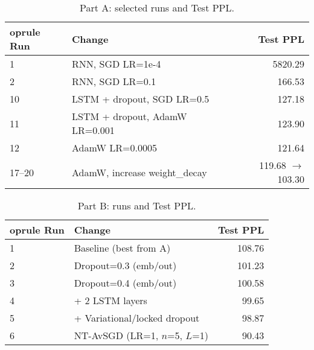 \documentclass[a4paper]{article}
\begin{document}
\begin{table}[h]
\centering
\caption{Part A: selected runs and Test PPL.}
\begin{tabular}{l l r}
	oprule
Run & Change & Test PPL \\
\midrule
1 & RNN, SGD LR=1e-4 & 5820.29 \\
2 & RNN, SGD LR=0.1 & 166.53 \\
10 & LSTM + dropout, SGD LR=0.5 & 127.18 \\
11 & LSTM + dropout, AdamW LR=0.001 & 123.90 \\
12 & AdamW LR=0.0005 & 121.64 \\
17--20 & AdamW, increase weight\_decay & 119.68 $\rightarrow$ 103.30 \\
\bottomrule
\end{tabular}
\end{table}

\begin{table}[h]
\centering
\caption{Part B: runs and Test PPL.}
\begin{tabular}{l l r}
	oprule
Run & Change & Test PPL \\
\midrule
1 & Baseline (best from A) & 108.76 \\
2 & Dropout=0.3 (emb/out) & 101.23 \\
3 & Dropout=0.4 (emb/out) & 100.58 \\
4 & + 2 LSTM layers & 99.65 \\
5 & + Variational/locked dropout & 98.87 \\
6 & NT-AvSGD (LR=1, $n$=5, $L$=1) & 90.43 \\
\bottomrule
\end{tabular}
\end{table}





\end{document}
